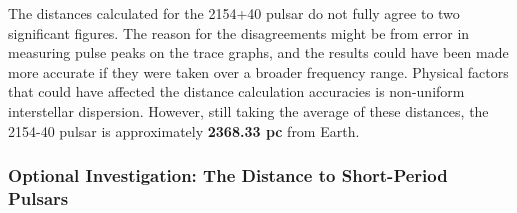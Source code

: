 \documentclass[12pt]{article}
\begin{document}
\begin{table}[H]
    \centering
    \caption{Distance to the 2154+40 pulsar through dispersion analysis using Eq. \ref{eq:3}.}
    \label{tab:4}
\end{table}

The distances calculated for the 2154+40 pulsar do not fully agree to two significant figures. The reason for the disagreements might be from error in measuring pulse peaks on the trace graphs, and the results could have been made more accurate if they were taken over a broader frequency range.
Physical factors that could have affected the distance calculation accuracies is non-uniform interstellar dispersion. However, still taking the average of these distances, the 2154-40 pulsar is approximately \textbf{2368.33 pc} from Earth.

\subsubsection{Optional Investigation: The Distance to Short-Period Pulsars}
\end{document}
